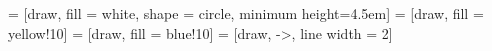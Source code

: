 





\def\clscellsize{4.5}
\def\blockdist{2.3}
\def\edgedist{2.5}
\def\clsdist{.1}
\def\varmargin{.25}
\def\timemargin{.25}



\def\clsgrpdist{\clscellsize * .1}
\def\vargrpdist{\clscellsize * .4}
\def\timegrpdist{\clscellsize * 1.5}




 = [draw, fill = white, shape = circle, minimum height=\clscellsize em]
 = [draw, fill = yellow!10]
 = [draw, fill = blue!10]
 = [draw, ->, line width = 2]
